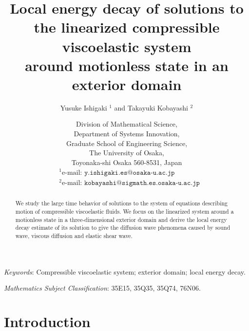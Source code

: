\documentclass[dvipdfmx,12pt]{article}
\begin{document}
\title{
\vspace{-5ex}
\large{
\bf Local energy decay of solutions to \\ 
the linearized compressible viscoelastic system \\ around  motionless state in an exterior domain}}
\author{
\large{Yusuke Ishigaki ${}^1$ and Takayuki Kobayashi ${}^2$}}
\date{\small
Division of Mathematical Science,\\[0.5ex]
Department of Systems Innovation,\\[0.5ex]
Graduate School of Engineering Science, \\[0.5ex]
The University of Osaka, \\[0.5ex]
Toyonaka-shi Osaka 560-8531, Japan \\[-3.5ex]
\begin{align*}
&{}^1 \textrm{e-mail:} \texttt{ y.ishigaki.es@osaka-u.ac.jp} \\
&{}^2 \textrm{e-mail:} \texttt{ kobayashi@sigmath.es.osaka-u.ac.jp}
\end{align*}
}

\maketitle

\begin{abstract}
We study the large time behavior of solutions to the system of equations describing motion of compressible viscoelastic ﬂuids. We focus on the linearized system around a motionless state in a three-dimensional exterior domain and derive the local energy decay estimate of its solution to give the diﬀusion wave phenomena caused by sound wave, viscous diffusion and elastic shear wave.
\end{abstract}
\textit{Keywords}: Compressible viscoelastic system; exterior domain; local energy decay.

\vspace{1ex}
\noindent
\textit{Mathematics Subject Classification}: 35E15, 35Q35, 35Q74, 76N06.


\section{Introduction}
\end{document}
